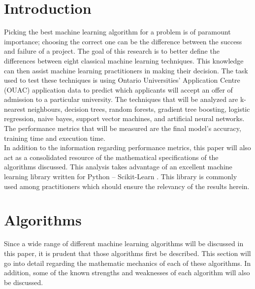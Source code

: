 \documentclass[titlepage]{article}
\begin{document}
\section{Introduction}
Picking the best machine learning algorithm for a problem is of paramount importance; choosing the correct one can be the difference between the success and failure of a project. The goal of this research is to better define the differences between eight classical machine learning techniques. This knowledge can then assist machine learning practitioners in making their decision. The task used to test these techniques is using Ontario Universities' Application Centre (OUAC) application data to predict which applicants will accept an offer of admission to a particular university. The techniques that will be analyzed are k-nearest neighbours, decision trees, random forests, gradient tree boosting, logistic regression, naive bayes, support vector machines, and artificial neural networks. The performance metrics that will be measured are the final model's accuracy, training time and execution time.\\
In addition to the information regarding performance metrics, this paper will also act as a consolidated resource of the mathematical specifications of the algorithms discussed. This analysis takes advantage of an excellent machine learning library written for Python -- Scikit-Learn \cite{scikit-learn}. This library is commonly used among practitioners which should ensure the relevancy of the results herein.



\newpage
\section{Algorithms}
Since a wide range of different machine learning algorithms will be discussed in this paper, it is prudent that those algorithms first be described. This section will go into detail regarding the mathematic mechanics of each of these algorithms. In addition, some of the known strengths and weaknesses of each algorithm will also be discussed.
\end{document}
